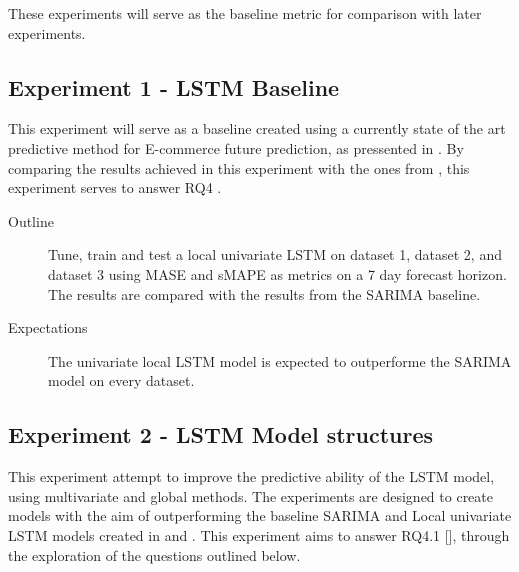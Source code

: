 These experiments will serve as the baseline metric for comparison with later experiments.




\subsection{Experiment 1 - LSTM Baseline}
\label{section:results:experimentPlan:Experiment-1}
This experiment will serve as a baseline created using a currently state of the art predictive method
for E-commerce future prediction, as pressented in .
By comparing the results achieved in this experiment with the ones from ,
this experiment serves to answer RQ4 .

\begin{description}
  \item[Outline]{
              Tune, train and test a local univariate LSTM on dataset 1,
              dataset 2, and dataset 3 using MASE and sMAPE as metrics on a 7 day forecast horizon.
              The results are compared with the results from the SARIMA baseline. }
\end{description}

\begin{description}
  \item[Expectations]{
              The univariate local LSTM model is expected to outperforme the SARIMA model on every dataset.
        }
\end{description}




\subsection{Experiment 2 - LSTM Model structures}
\label{section:results:experimentPlan:Experiment-2}
This experiment attempt to improve the predictive ability of the LSTM model,
using multivariate and global methods.
The experiments are designed to create models with the aim of outperforming the baseline
SARIMA and Local univariate LSTM models created in  and .
This experiment aims to answer RQ4.1 [],
through the exploration of the questions outlined below.

